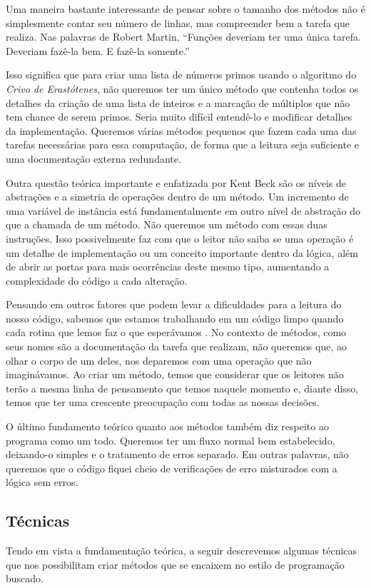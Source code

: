 Uma maneira bastante interessante de pensar sobre o tamanho dos métodos não é simplesmente contar seu número de linhas, mas compreender bem a tarefa que realiza. Nas palavras de Robert Martin, “Funções deveriam ter uma única tarefa. Deveriam fazê-la bem. E fazê-la somente.”
	
Isso significa que para criar uma lista de números primos usando o algoritmo do \textit{Crivo de Erastótenes}, não queremos ter um único método que contenha todos os detalhes da criação de uma lista de inteiros e a marcação de múltiplos que não tem chance de serem primos. Seria muito difícil entendê-lo e modificar detalhes da implementação. Queremos várias métodos pequenos que fazem cada uma das tarefas necessárias para essa computação, de forma que a leitura seja suficiente e uma documentação externa redundante.
	
Outra questão teórica importante e enfatizada por Kent Beck são os níveis de abstrações e a simetria de operações dentro de um método. Um incremento de uma variável de instância está fundamentalmente em outro nível de abstração do que a chamada de um método. Não queremos um método com essas duas instruções. Isso possivelmente faz com que o leitor não saiba se uma operação é um detalhe de implementação ou um conceito importante dentro da lógica, além de abrir as portas para mais ocorrências deste mesmo tipo, aumentando a complexidade do código a cada alteração.
	
Pensando em outros fatores que podem levar a dificuldades para a leitura do nosso código, sabemos que estamos trabalhando em um código limpo quando cada rotina que lemos faz o que esperávamos \citep{Martin2008}. No contexto de métodos, como seus nomes são a documentação da tarefa que realizam, não queremos que, ao olhar o corpo de um deles, nos deparemos com uma operação que não imaginávamos. Ao criar um método, temos que considerar que os leitores não terão a mesma linha de pensamento que temos naquele momento e, diante disso, temos que ter uma crescente preocupação com todas as nossas decisões.
	
O último fundamento teórico quanto aos métodos também diz respeito ao programa como um todo. Queremos ter um fluxo normal bem estabelecido, deixando-o simples e o tratamento de erros separado. Em outras palavras, não queremos que o código fiquei cheio de verificações de erro misturados com a lógica sem erros.
	
\subsection{Técnicas}
Tendo em vista a fundamentação teórica, a seguir descrevemos algumas técnicas que nos possibilitam criar métodos que se encaixem no estilo de programação buscado.

